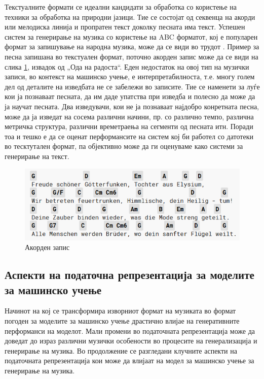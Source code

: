 Текстуалните формати се идеални кандидати за обработка со користење на техники за обработка на природни јазици. Тие се состојат од секвенца на акорди или мелодиска линија и пропратен текст доколку песната има текст. Успешен систем за генерирање на музика со користење на ABC форматот, кој е популарен формат за запишување на народна музика, може да се види во трудот \cite{Sturm2015}. Пример за песна запишана во текстуален формат, поточно акорден запис може да се види на слика \ref{fig:akordi}, извадок од „Ода на радоста“. Еден недостаток на овој тип на музички записи, во контекст на машинско учење, е интерпретабилноста, т.е. многу голем дел од деталите на изведбата не се забележи во записите. Тие се наменети за луѓе кои ја познаваат песната, да им даде упатства при изведба и полесно да може да ја научат песната. Два изведувачи, кои не ја познаваат најдобро конретната песна, може да ја изведат на сосема различни начини, пр. со различно темпо, различна метричка структура, различни времетраења на сегменти од песната итн. Поради тоа и тешко е да се оценат перформансите на систем кој би работел со датотеки во тесктутален формат, па објективно може да ги оценуваме како системи за генерирање на текст.

\begin{figure}[H]
	\centering
\includegraphics[scale=0.9]{images/ode_to_joy.png}
	\caption{Акорден запис}
	\label{fig:akordi}
\end{figure}

\subsection{Аспекти на податочна репрезентација за моделите за машинско учење}

Начинот на кој се трансформира изворниот формат на музиката во формат погоден за моделите за машинско учење драстично влијае на генеративните перформанси на моделот. Мали промени во податочната репрезентација може да доведат до израз различни музички особености во процесите на генерализација и генерирање на музика. Во продолжение се разгледани клучните аспекти на податочната репрезентација кои може да влијаат на модел за машинско учење за генерирање на музика.

